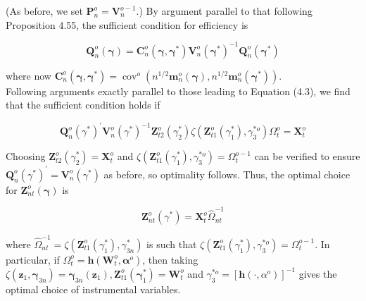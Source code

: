 \documentclass[10pt]{article}
\begin{document}
(As before, we set $\mathbf{P}_{n}^{o}=\mathbf{V}_{n}^{o-1}$.) By argument parallel to that following Proposition 4.55, the sufficient condition for efficiency is

$$
\mathbf{Q}_{n}^{o}(\boldsymbol{\gamma})=\mathbf{C}_{n}^{o}\left(\boldsymbol{\gamma}, \boldsymbol{\gamma}^{*}\right) \mathbf{V}_{n}^{o}\left(\boldsymbol{\gamma}^{*}\right)^{-1} \mathbf{Q}_{n}^{o}\left(\boldsymbol{\gamma}^{*}\right)
$$

where now $\mathbf{C}_{n}^{o}\left(\boldsymbol{\gamma}, \boldsymbol{\gamma}^{*}\right)=\operatorname{cov}^{o}\left(n^{1 / 2} \mathbf{m}_{n}^{o}(\boldsymbol{\gamma}), n^{1 / 2} \mathbf{m}_{n}^{o}\left(\boldsymbol{\gamma}^{*}\right)\right)$.\\
Following arguments exactly parallel to those leading to Equation (4.3), we find that the sufficient condition holds if

$$
\mathbf{Q}_{n}^{o}\left(\gamma^{*}\right)^{\prime} \mathbf{V}_{n}^{o}\left(\gamma^{*}\right)^{-1} \mathbf{Z}_{t 2}^{o}\left(\gamma_{2}^{*}\right) \zeta\left(\mathbf{Z}_{t 1}^{o}\left(\gamma_{1}^{*}\right), \gamma_{3}^{* o}\right) \Omega_{t}^{o}=\mathbf{X}_{t}^{o}
$$

Choosing $\mathbf{Z}_{t 2}^{o}\left(\gamma_{2}^{*}\right)=\mathbf{X}_{t}^{o}$ and $\zeta\left(\mathbf{Z}_{t 1}^{o}\left(\gamma_{1}^{*}\right), \gamma_{3}^{* o}\right)=\Omega_{t}^{o-1}$ can be verified to ensure $\mathbf{Q}_{n}^{o}\left(\gamma^{*}\right)^{\prime}=\mathbf{V}_{n}^{o}\left(\gamma^{*}\right)$ as before, so optimality follows. Thus, the optimal choice for $\mathbf{Z}_{n t}^{o}(\boldsymbol{\gamma})$ is

$$
\mathbf{Z}_{n t}^{o}\left(\gamma^{*}\right)=\mathbf{X}_{t}^{o} \hat{\Omega}_{n t}^{-1}
$$

where $\hat{\Omega}_{n t}^{-1}=\zeta\left(\mathbf{Z}_{t 1}^{o}\left(\gamma_{1}^{*}\right), \gamma_{3 n}^{*}\right)$ is such that $\zeta\left(\mathbf{Z}_{t 1}^{o}\left(\gamma_{1}^{*}\right), \gamma_{3}^{* o}\right)=\Omega_{t}^{o-1}$. In particular, if $\Omega_{t}^{o}=\mathbf{h}\left(\mathbf{W}_{t}^{o}, \boldsymbol{\alpha}^{o}\right)$, then taking $\zeta\left(\mathbf{z}_{1}, \boldsymbol{\gamma}_{3 n}\right)=\boldsymbol{\gamma}_{3 n}\left(\mathbf{z}_{1}\right), \mathbf{Z}_{t 1}^{o}\left(\boldsymbol{\gamma}_{1}^{*}\right)= \mathbf{W}_{t}^{o}$ and $\gamma_{3}^{* o}=\left[\mathbf{h}\left(\cdot, \alpha^{o}\right)\right]^{-1}$ gives the optimal choice of instrumental variables.
\end{document}
